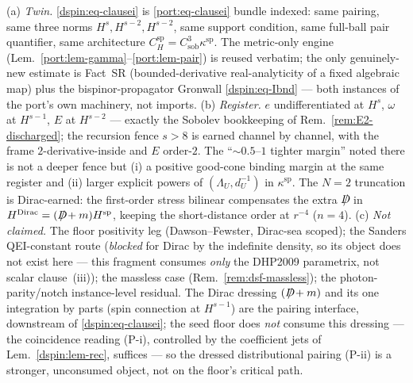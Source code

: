 \begin{remark}\label{dspin:rem-match}
(a) \emph{Twin.} \eqref{dspin:eq-clausei} is \eqref{port:eq-clausei} bundle
indexed: same pairing, same three norms $H^s,H^{s-2},H^{s-2}$, same support
condition, same full-ball pair quantifier, same architecture
$C_H^{\mathrm{sp}}=C_{\mathrm{sob}}^3\kappa^{\mathrm{sp}}$. The metric-only
engine (Lem.~\ref{port:lem-gamma}--\ref{port:lem-pair}) is reused verbatim; the
only genuinely-new estimate is Fact~SR (bounded-derivative real-analyticity of
a fixed algebraic map) plus the bispinor-propagator Gronwall
\eqref{dspin:eq-Ibnd} --- both instances of the port's own machinery, not
imports. (b) \emph{Register.} $e$ undifferentiated at $H^s$, $\omega$ at
$H^{s-1}$, $E$ at $H^{s-2}$ --- exactly the Sobolev bookkeeping of
Rem.~\ref{rem:E2-discharged}; the recursion fence $s>8$ is earned channel by channel, with the
frame $2$-derivative-inside and $E$ order-$2$. The ``$\sim0.5$--$1$ tighter
margin'' noted there is not a deeper fence but (i) a positive good-cone binding
margin at the same register and (ii) larger explicit powers of
$(\Lambda_U,d_U^{-1})$ in $\kappa^{\mathrm{sp}}$. The $N=2$ truncation is
Dirac-earned: the first-order stress bilinear compensates the extra
$D\mkern-12mu/$ in $H^{\mathrm{Dirac}}=(D\mkern-12mu/+m)H^{\mathrm{sp}}$, keeping the
short-distance order at $r^{-4}$ ($n=4$). (c) \emph{Not claimed.} The floor
positivity leg (Dawson--Fewster, Dirac-sea scoped); the Sanders QEI-constant
route (\emph{blocked} for Dirac by the indefinite density, so its object does
not exist here --- this fragment consumes \emph{only} the DHP2009 parametrix,
not scalar clause~(iii)); the massless case (Rem.~\ref{rem:dsf-massless}); the
photon-parity/notch instance-level residual. The Dirac dressing
$(D\mkern-12mu/+m)$ and its one integration by parts (spin connection at
$H^{s-1}$) are the pairing interface, downstream of \eqref{dspin:eq-clausei};
the seed floor does \emph{not} consume this dressing --- the coincidence
reading (P-i), controlled by the coefficient jets of
Lem.~\ref{dspin:lem-rec}, suffices --- so the dressed distributional
pairing (P-ii) is a stronger, unconsumed object, not on the floor's
critical path.
\end{remark}

